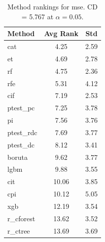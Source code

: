 \begin{table}[h]
\centering
\caption{Method rankings for mse. CD = 5.767 at $\alpha=0.05$.}
\label{tab:ranks_mse}
\begin{tabular}{lcc}
\toprule
Method & Avg Rank & Std \\
\midrule
cat & 4.25 & 2.59 \\
et & 4.69 & 2.78 \\
rf & 4.75 & 2.36 \\
rfe & 5.31 & 4.12 \\
cif & 7.19 & 2.53 \\
ptest_pc & 7.25 & 3.78 \\
pi & 7.56 & 3.76 \\
ptest_rdc & 7.69 & 3.77 \\
ptest_dc & 8.12 & 3.41 \\
boruta & 9.62 & 3.77 \\
lgbm & 9.88 & 3.55 \\
cit & 10.06 & 3.85 \\
cpi & 10.12 & 5.05 \\
xgb & 12.19 & 3.54 \\
r_cforest & 13.62 & 3.52 \\
r_ctree & 13.69 & 3.69 \\
\bottomrule
\end{tabular}
\end{table}